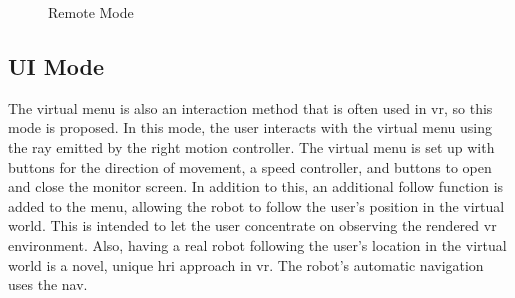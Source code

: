 \begin{figure}[htbp]
    \centering
    \caption{Remote Mode}
    \label{fig:remote} 
\end{figure}


\subsection{UI Mode}
The virtual menu is also an interaction method that is often used in \gls{vr}, so this mode is proposed. In this mode, the user interacts with the virtual menu using the ray emitted by the right motion controller. The virtual menu is set up with buttons for the direction of movement, a speed controller, and buttons to open and close the monitor screen. In addition to this, an additional follow function is added to the menu, allowing the robot to follow the user's position in the virtual world. This is intended to let the user concentrate on observing the rendered \gls{vr} environment. Also, having a real robot following the user's location in the virtual world is a novel, unique \gls{hri} approach in \gls{vr}. The robot's automatic navigation uses the \gls{nav}.

